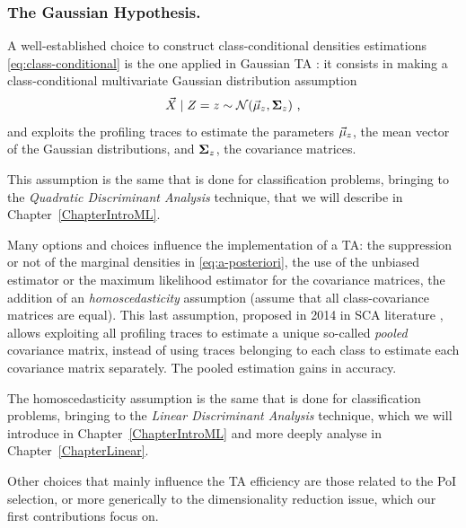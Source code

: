 \subsubsection{The Gaussian Hypothesis.} A well-established choice to construct class-conditional densities estimations \ref{eq:class-conditional} is the one applied in Gaussian TA \cite{Chari2003}: it consists in making a class-conditional multivariate Gaussian distribution assumption
\begin{equation}\label{eq:gaussian_assumption}
\given{\vaLeakVec}{\sensRandVar} =\sensVar \sim \mathcal{N}(\mumumu_\sensVar, \boldsymbol{\Sigma}_\sensVar)\mbox{ ,}
\end{equation} 
and exploits the profiling traces to estimate the  parameters $\vec{\mu}_z$, \ie the mean vector of the Gaussian distributions, and $ \boldsymbol{\Sigma}_z$, \ie the covariance matrices. \\

\begin{remark}This assumption is the same that is done for classification problems, bringing to the \emph{Quadratic Discriminant Analysis} technique, that we will describe in Chapter~\ref{ChapterIntroML}. 
\end{remark}

Many options and choices influence the implementation of a TA: the suppression or not of the marginal densities in \eqref{eq:a-posteriori}, the use of the unbiased estimator or the maximum likelihood estimator for the covariance matrices, the addition of an \emph{homoscedasticity} assumption (assume that all class-covariance matrices are equal). This last assumption, proposed in 2014 in SCA literature \cite{choudary2014efficient},  allows exploiting all profiling traces to estimate a unique so-called \emph{pooled} covariance matrix, instead of using traces belonging to each class to estimate each covariance matrix separately. The pooled estimation gains in accuracy. 

\begin{remark}
The homoscedasticity assumption is the same that is done for classification problems, bringing to the \emph{Linear Discriminant Analysis} technique, which we will introduce in Chapter~\ref{ChapterIntroML} and more deeply analyse in Chapter~\ref{ChapterLinear}.  
\end{remark}

Other choices that mainly influence the TA efficiency are those related to the PoI selection, or more generically to the dimensionality reduction issue, which our first contributions focus on.

